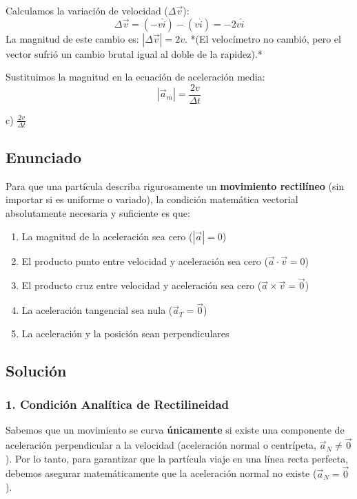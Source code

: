 \documentclass[12pt, a4paper]{article}
\begin{document}
Calculamos la variación de velocidad ($\Delta \vec{v}$):
$$ \Delta \vec{v} = (-v\hat{i}) - (v\hat{i}) = -2v\hat{i} $$
La magnitud de este cambio es: $|\Delta \vec{v}| = 2v$.
*(El velocímetro no cambió, pero el vector sufrió un cambio brutal igual al doble de la rapidez).*

Sustituimos la magnitud en la ecuación de aceleración media:
$$ |\vec{a}_m| = \frac{2v}{\Delta t} $$

\begin{tcolorbox}[colback=green!5!white, colframe=green!50!black, title=Respuesta Final]
\centering \Large c) $\frac{2v}{\Delta t}$
\end{tcolorbox}

\newpage

\subsection*{Enunciado}
Para que una partícula describa rigurosamente un \textbf{movimiento rectilíneo} (sin importar si es uniforme o variado), la condición matemática vectorial absolutamente necesaria y suficiente es que:
\begin{enumerate}[label=\alph*)]
    \item La magnitud de la aceleración sea cero ($|\vec{a}| = 0$)
    \item El producto punto entre velocidad y aceleración sea cero ($\vec{a} \cdot \vec{v} = 0$)
    \item El producto cruz entre velocidad y aceleración sea cero ($\vec{a} \times \vec{v} = \vec{0}$)
    \item La aceleración tangencial sea nula ($\vec{a}_T = \vec{0}$)
    \item La aceleración y la posición sean perpendiculares
\end{enumerate}

\subsection*{Solución}

\subsubsection*{1. Condición Analítica de Rectilineidad}
Sabemos que un movimiento se curva \textbf{únicamente} si existe una componente de aceleración perpendicular a la velocidad (aceleración normal o centrípeta, $\vec{a}_N \neq \vec{0}$).
Por lo tanto, para garantizar que la partícula viaje en una línea recta perfecta, debemos asegurar matemáticamente que la aceleración normal no existe ($\vec{a}_N = \vec{0}$).
\end{document}
